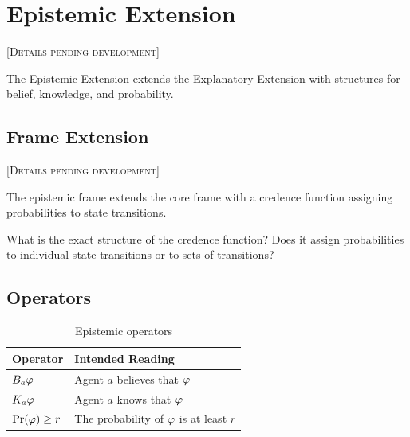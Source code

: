 \documentclass[../LogosReference.tex]{subfiles}
\begin{document}

\section{Epistemic Extension}\label{sec:epistemic}

\textsc{[Details pending development]}

The Epistemic Extension extends the Explanatory Extension with structures for belief, knowledge, and probability.


\subsection{Frame Extension}\label{sec:epistemic-frame}

\textsc{[Details pending development]}

The epistemic frame extends the core frame with a credence function
assigning probabilities to state transitions.

\begin{question}
What is the exact structure of the credence function?
Does it assign probabilities to individual state transitions or to sets of transitions?
\end{question}


\subsection{Operators}\label{sec:epistemic-operators}

\begin{table}[h]
\centering
\begin{tabular}{ll}
\toprule
\textbf{Operator} & \textbf{Intended Reading} \\
\midrule
$B_a \varphi$ & Agent $a$ believes that $\varphi$ \\
$K_a \varphi$ & Agent $a$ knows that $\varphi$ \\
$\Pr(\varphi) \geq r$ & The probability of $\varphi$ is at least $r$ \\
\bottomrule
\end{tabular}
\caption{Epistemic operators}
\label{tab:epistemic-operators}
\end{table}
\end{document}
